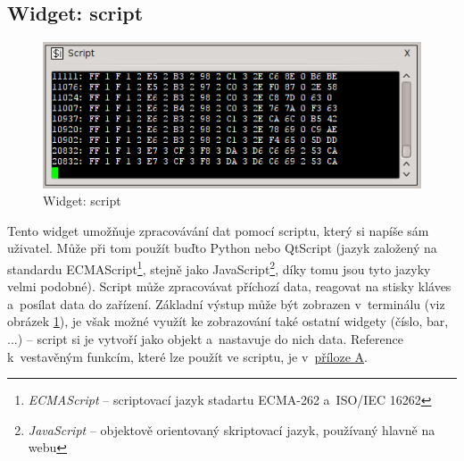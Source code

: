 \documentclass[12pt, a4paper, oneside]{article}
\newcommand{\It}{\textit}  %
\begin{document}
\subsection{Widget: script}
\begin{figure}[h]
\begin{center}
\includegraphics[scale=0.8]{img/w_script.png}
\caption{Widget: script}
\label{script_w}
\end{center}
\end{figure}
Tento widget umožňuje zpracovávání dat pomocí scriptu, který si napíše sám uživatel. Může při tom použít buďto Python nebo QtScript\cite{qtscript} (jazyk založený na standardu ECMAScript\footnote{\It{ECMAScript} -- scriptovací jazyk stadartu ECMA-262 a~ISO/IEC 16262}, stejně jako JavaScript\footnote{\It{JavaScript} -- objektově orientovaný skriptovací jazyk, používaný hlavně na webu}, díky tomu jsou tyto jazyky velmi podobné). Script může zpracovávat příchozí data, reagovat na stisky kláves a~posílat data do zařízení. Základní výstup může být zobrazen v~terminálu (viz obrázek \ref{script_w}), je však možné využít ke zobrazování také ostatní widgety (číslo, bar, ...) -- script si je vytvoří jako objekt a~nastavuje do nich data. Reference k~vestavěným funkcím, které lze použít ve scriptu, je v~\hyperref[script_ref]{příloze A}.
\end{document}
